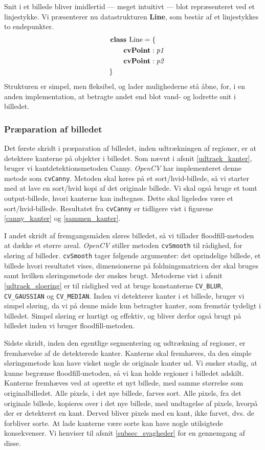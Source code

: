 {Snit i et billede bliver imidlertid --- meget intuitivt --- blot
repræsenteret ved et linjestykke. Vi præsenterer nu datastrukturen
\textbf{Line}, som består af et linjestykkes to endepunkter.
\begin{multline}
    \textbf{class~} \textrm{Line} = \{ \\
    \shoveleft{\qquad\textbf{cvPoint} : \textit{p1}} \\
    \shoveleft{\qquad\textbf{cvPoint} : \textit{p2}} \\
    \shoveleft{\}}\shoveright{}
    \label{Line_class}
\end{multline}
Strukturen er simpel, men fleksibel, og lader mulighederne stå åbne,
for, i en anden implementation, at betragte andet end blot vand- og
lodrette snit i billedet.

\subsubsection{Præparation af billedet}
Det første skridt i præparation af billedet, inden udtrækningen af
regioner, er at detektere kanterne på objekter i billedet.  Som nævnt i
afsnit \ref{udtraek_kanter}, bruger vi kantdetektionsmetoden Canny.
\emph{OpenCV} har implementeret denne metode som \texttt{cvCanny}.
Metoden skal køres på et sort/hvid-billede, så vi starter med at lave en
sort/hvid kopi af det originale billede. Vi skal også bruge et tomt
output-billede, hvori kanterne kan indtegnes. Dette skal ligeledes være
et sort/hvid-billede. Resultatet fra \texttt{cvCanny} er tidligere vist
i figurene \ref{canny_kanter} og \ref{sammen_kanter}.

I andet skridt af fremgangsmåden sløres billedet, så vi tillader
floodfill-metoden at dække et større areal. \emph{OpenCV} stiller
metoden \texttt{cvSmooth} til rådighed, for sløring af billeder.
\texttt{cvSmooth} tager følgende argumenter: det oprindelige billede, et
billede hvori resultatet vises, dimensionerne på foldningsmatricen der
skal bruges samt hvilken sløringsmetode der ønskes brugt. Metoderne vist
i afsnit \ref{udtraek_sloering} er til rådighed ved at bruge
konstanterne \texttt{CV\_BLUR}, \texttt{CV\_GAUSSIAN} og
\texttt{CV\_MEDIAN}. Inden vi detekterer kanter i et billede, bruger vi
simpel sløring, da vi på denne måde kun betragter kanter, som fremstår
tydeligt i billedet.  Simpel sløring er hurtigt og effektiv, og bliver
derfor også brugt på billedet inden vi bruger floodfill-metoden.

Sidste skridt, inden den egentlige segmentering og udtrækning af
regioner, er fremhævelse af de detekterede kanter. Kanterne skal
fremhæves, da den simple sløringsmetode kan have visket nogle de
originale kanter ud.  Vi ønsker stadig, at kunne begrænse
floodfill-metoden, så vi kan holde regioner i billedet adskilt. Kanterne
fremhæves ved at oprette et nyt billede, med samme størrelse som
originalbilledet. Alle pixels, i det nye billede, farves sort. Alle
pixels, fra det originale billede, kopieres over i det nye billede, med
undtagelse af pixels, hvorpå der er detekteret en kant. Derved bliver
pixels med en kant, ikke farvet, dvs.  de forbliver sorte. At lade
kanterne være sorte kan have nogle utilsigtede konsekvenser. Vi henviser
til afsnit \ref{subsec_svagheder} for en gennemgang af disse.

}
